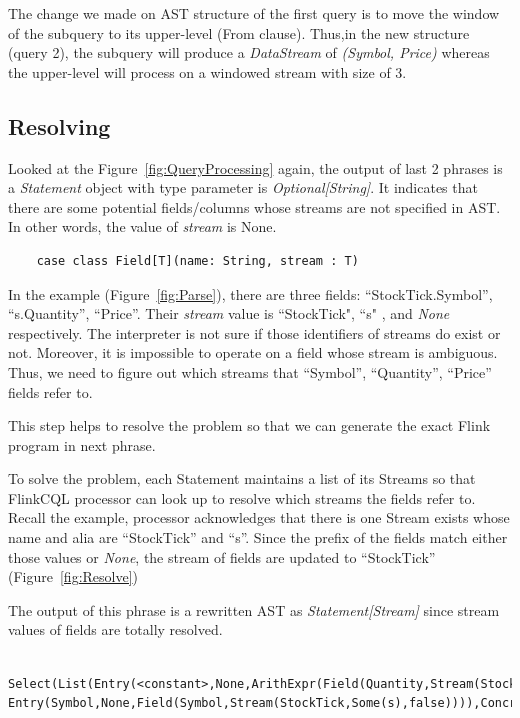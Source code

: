 The change we made on AST structure of the first query is to move the window of the subquery to its upper-level (From clause). Thus,in the new structure (query 2), the subquery will produce a \textit{DataStream} of \textit{(Symbol, Price)} whereas the upper-level will process on a windowed stream with size of 3. 

\subsection{Resolving}
Looked at the Figure~\ref{fig:QueryProcessing} again,  the output of last 2 phrases is a \textit{Statement} object with type parameter is \textit{Optional[String]}.
It indicates that there are some potential fields/columns whose streams are not specified in AST. In other words, the value of \textit{stream} is None.
\begin{lstlisting}
	case class Field[T](name: String, stream : T)
\end{lstlisting}

In the example (Figure~\ref{fig:Parse}), there are three fields: ``StockTick.Symbol”, ``s.Quantity”, ``Price”. Their \textit{stream} value is ``StockTick", ``s" , and \textit{None} respectively. The interpreter is not sure if those identifiers of streams do exist or not. Moreover, it is impossible to operate on a field whose stream is ambiguous. Thus, we need to figure out  which streams that ``Symbol”, ``Quantity”, ``Price”  fields refer to.

This step helps to resolve the problem so that we can generate the exact Flink program in next phrase.

To solve the problem, each Statement maintains a list of its Streams so that FlinkCQL processor can look up to resolve which streams the fields refer to. Recall the example, processor acknowledges that there is one Stream exists whose name and alia are ``StockTick'' and ``s''. Since the prefix of the fields match either those values or \textit{None}, the stream of fields are updated to ``StockTick'' (Figure~\ref{fig:Resolve})

The output of this phrase is a rewritten AST as \textit{Statement[Stream]} since stream values of  fields are totally resolved.

\begin{lstlisting}
	Select(List(Entry(<constant>,None,ArithExpr(Field(Quantity,Stream(StockTick,Some(s),false)),*,Field(Price,Stream(StockTick,Some(s),false)))), Entry(Symbol,None,Field(Symbol,Stream(StockTick,Some(s),false)))),ConcreteStream(Stream(StockTick,Some(s),false),None,None),None,None)

\end{lstlisting}

